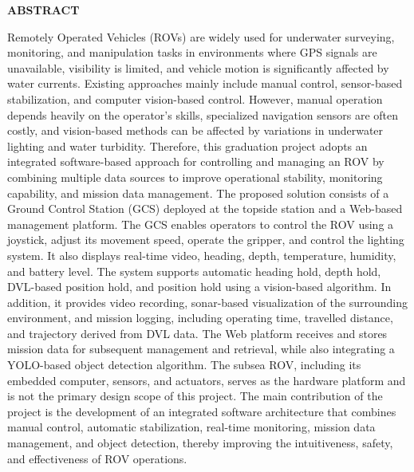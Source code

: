 \documentclass[../DoAn.tex]{subfiles}
\begin{document}
{%

\begin{center}
    \Large{\textbf{ABSTRACT}}\\
\end{center}
\vspace{1cm}
Remotely Operated Vehicles (ROVs) are widely used for underwater surveying, monitoring, and manipulation tasks in environments where GPS signals are unavailable, visibility is limited, and vehicle motion is significantly affected by water currents. Existing approaches mainly include manual control, sensor-based stabilization, and computer vision-based control. However, manual operation depends heavily on the operator’s skills, specialized navigation sensors are often costly, and vision-based methods can be affected by variations in underwater lighting and water turbidity. Therefore, this graduation project adopts an integrated software-based approach for controlling and managing an ROV by combining multiple data sources to improve operational stability, monitoring capability, and mission data management. The proposed solution consists of a Ground Control Station (GCS) deployed at the topside station and a Web-based management platform. The GCS enables operators to control the ROV using a joystick, adjust its movement speed, operate the gripper, and control the lighting system. It also displays real-time video, heading, depth, temperature, humidity, and battery level. The system supports automatic heading hold, depth hold, DVL-based position hold, and position hold using a vision-based algorithm. In addition, it provides video recording, sonar-based visualization of the surrounding environment, and mission logging, including operating time, travelled distance, and trajectory derived from DVL data. The Web platform receives and stores mission data for subsequent management and retrieval, while also integrating a YOLO-based object detection algorithm. The subsea ROV, including its embedded computer, sensors, and actuators, serves as the hardware platform and is not the primary design scope of this project. The main contribution of the project is the development of an integrated software architecture that combines manual control, automatic stabilization, real-time monitoring, mission data management, and object detection, thereby improving the intuitiveness, safety, and effectiveness of ROV operations.


}%
\end{document}
